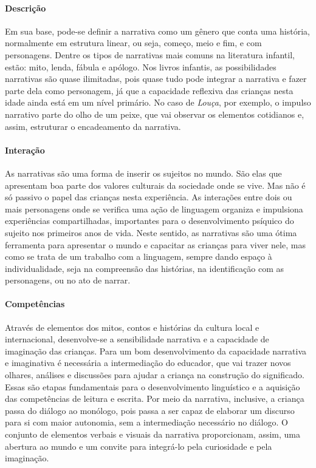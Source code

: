 \documentclass[11pt]{extarticle}
\begin{document}

\paragraph{Descrição} Em sua base, pode-se definir a narrativa como um gênero que conta uma história, normalmente em estrutura linear, ou seja, começo, meio e fim, e com personagens. 
Dentre os tipos de narrativas mais comuns na literatura infantil, estão: mito, lenda, 
fábula e apólogo. Nos livros infantis, as possibilidades narrativas são quase ilimitadas, pois quase tudo pode integrar a narrativa e fazer parte dela como personagem, já que a capacidade reflexiva das crianças nesta idade ainda está em um nível primário. No caso de \textit{Louça}, por exemplo, o impulso narrativo parte do olho de um peixe, que vai observar os elementos cotidianos e, assim, estruturar o encadeamento da narrativa.

\paragraph{Interação} As narrativas são uma forma de inserir os sujeitos no mundo. 
São elas que apresentam boa parte dos valores culturais da sociedade 
onde se vive. Mas não é só passivo o papel das crianças nesta experiência. 
As interações entre dois ou mais personagens onde se verifica
uma ação de linguagem organiza e impulsiona experiências compartilhadas,
importantes para o desenvolvimento psíquico do sujeito nos primeiros anos de vida.
Neste sentido, as narrativas são uma ótima ferramenta para
apresentar o mundo e capacitar as crianças para viver nele, mas como se
trata de um trabalho com a linguagem, sempre dando espaço à individualidade, 
seja na compreensão das histórias, na identificação com as personagens, ou 
no ato de narrar.

\paragraph{Competências} 
Através de elementos dos mitos, contos e histórias da cultura local e internacional, desenvolve-se a sensibilidade narrativa e a capacidade de imaginação das crianças. Para um bom desenvolvimento da capacidade narrativa e imaginativa é necessária a intermediação do educador, que vai trazer novos olhares, análises e discussões para ajudar a criança na construção do significado. Essas são etapas fundamentais para o desenvolvimento linguístico e a aquisição das competências de leitura e escrita. Por meio da narrativa, inclusive, a criança passa do diálogo ao monólogo, pois passa a ser capaz de elaborar um discurso para si com maior autonomia, sem a intermediação necessário no diálogo.
O conjunto de elementos verbais e visuais da narrativa proporcionam, assim,
uma abertura ao mundo e um convite para integrá-lo pela curiosidade e pela imaginação.
\end{document}
